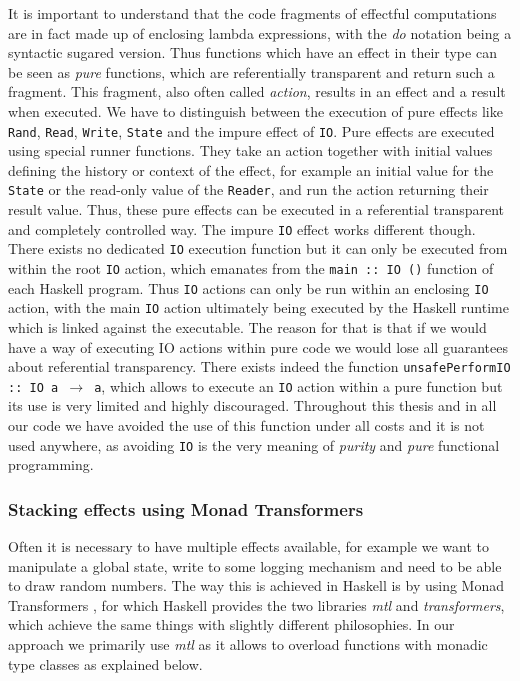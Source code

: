 It is important to understand that the code fragments of effectful computations are in fact  made up of enclosing lambda expressions, with the \textit{do} notation being a syntactic sugared version. Thus functions which have an effect in their type can be seen as \textit{pure} functions, which are referentially transparent and return such a fragment. This fragment, also often called \textit{action}, results in an effect and a result when executed. We have to distinguish between the execution of pure effects like \texttt{Rand}, \texttt{Read}, \texttt{Write}, \texttt{State} and the impure effect of \texttt{IO}. Pure effects are executed using special runner functions. They take an action together with initial values defining the history or context of the effect, for example an initial value for the \texttt{State} or the read-only value of the \texttt{Reader}, and run the action returning their result value. Thus, these pure effects can be executed in a referential transparent and completely controlled way. The impure \texttt{IO} effect works different though. There exists no dedicated \texttt{IO} execution function but it can only be executed from within the root \texttt{IO} action, which emanates from the \texttt{main :: IO ()} function of each Haskell program. Thus \texttt{IO} actions can only be run within an enclosing \texttt{IO} action, with the main \texttt{IO} action ultimately being executed by the Haskell runtime which is linked against the executable. The reason for that is that if we would have a way of executing IO actions within pure code we would lose all guarantees about referential transparency. There exists indeed the function \texttt{unsafePerformIO :: IO a $\rightarrow$ a}, which allows to execute an \texttt{IO} action within a pure function but its use is very limited and highly discouraged. Throughout this thesis and in all our code we have avoided the use of this function under all costs and it is not used anywhere, as avoiding \texttt{IO} is the very meaning of \textit{purity} and \textit{pure} functional programming.

\subsubsection{Stacking effects using Monad Transformers}
\label{sec:back_transformers}
Often it is necessary to have multiple effects available, for example we want to manipulate a global state, write to some logging mechanism and need to be able to draw random numbers. The way this is achieved in Haskell is by using Monad Transformers \cite{jones_functional_1995}, for which Haskell provides the two libraries \textit{mtl} and \textit{transformers}, which achieve the same things with slightly different philosophies. In our approach we primarily use \textit{mtl} as it allows to overload functions with monadic type classes as explained below.

